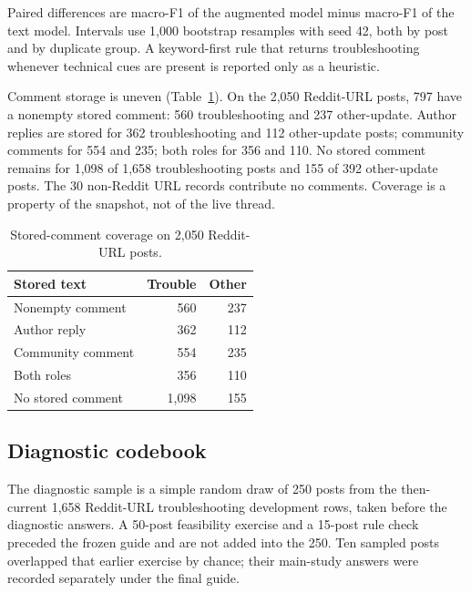\documentclass[conference,letterpaper]{IEEEtran}
\begin{document}
Paired differences are macro-F1 of the augmented model minus macro-F1 of the text model. Intervals use 1,000 bootstrap resamples with seed 42, both by post and by duplicate group. A keyword-first rule that returns troubleshooting whenever technical cues are present is reported only as a heuristic.

Comment storage is uneven (Table~\ref{tab:cov}). On the 2,050 Reddit-URL posts, 797 have a nonempty stored comment: 560 troubleshooting and 237 other-update. Author replies are stored for 362 troubleshooting and 112 other-update posts; community comments for 554 and 235; both roles for 356 and 110. No stored comment remains for 1,098 of 1,658 troubleshooting posts and 155 of 392 other-update posts. The 30 non-Reddit URL records contribute no comments. Coverage is a property of the snapshot, not of the live thread.

\begin{table}[t]
\caption{Stored-comment coverage on 2,050 Reddit-URL posts.}
\label{tab:cov}
\centering
\footnotesize
\setlength{\tabcolsep}{4pt}
\begin{tabular}{lrr}
\toprule
Stored text & Trouble & Other \\
\midrule
Nonempty comment & 560 & 237 \\
Author reply & 362 & 112 \\
Community comment & 554 & 235 \\
Both roles & 356 & 110 \\
No stored comment & 1,098 & 155 \\
\bottomrule
\end{tabular}
\end{table}

\subsection{Diagnostic codebook}
The diagnostic sample is a simple random draw of 250 posts from the then-current 1,658 Reddit-URL troubleshooting development rows, taken before the diagnostic answers. A 50-post feasibility exercise and a 15-post rule check preceded the frozen guide and are not added into the 250. Ten sampled posts overlapped that earlier exercise by chance; their main-study answers were recorded separately under the final guide.
\end{document}
